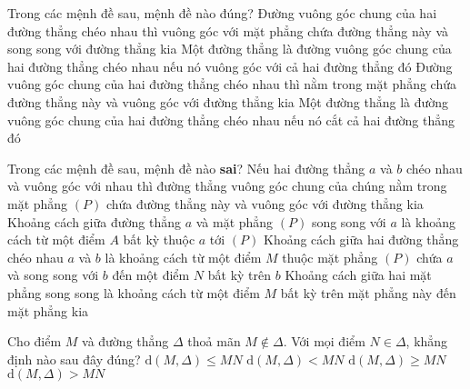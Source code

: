 \begin{ex}%
	Trong các mệnh đề sau, mệnh đề nào đúng?
	\choice
	{\True Đường vuông góc chung của hai đường thẳng chéo nhau thì vuông góc với mặt phẳng chứa đường thẳng này và song song với đường thẳng kia}
	{Một đường thẳng là đường vuông góc chung của hai đường thẳng chéo nhau nếu nó vuông góc với cả hai đường thẳng đó}
	{Đường vuông góc chung của hai đường thẳng chéo nhau thì nằm trong mặt phẳng chứa đường thẳng này và vuông góc với đường thẳng kia}
	{Một đường thẳng là đường vuông góc chung của hai đường thẳng chéo nhau nếu nó cắt cả hai đường thẳng đó}
\end{ex}
\begin{ex}%
	Trong các mệnh đề sau, mệnh đề nào \textbf{sai}?
	\choice
	{Nếu hai đường thẳng $a$ và $b$ chéo nhau và vuông góc với nhau thì đường thẳng vuông góc chung của chúng nằm trong mặt phẳng $(P)$ chứa đường thẳng này và vuông góc với đường thẳng kia}
	{Khoảng cách giữa đường thẳng $a$ và mặt phẳng $(P)$ song song với $a$ là khoảng cách từ một điểm $A $ bất kỳ thuộc $a$ tới $(P)$}
	{\True Khoảng cách giữa hai đường thẳng chéo nhau $a$ và $b$ là khoảng cách từ một điểm $M$ thuộc mặt phẳng $(P)$ chứa $a$ và song song với $b$ đến một điểm $N$ bất kỳ trên $b$}
	{Khoảng cách giữa hai mặt phẳng song song là khoảng cách từ một điểm $M$ bất kỳ trên mặt phẳng này đến mặt phẳng kia}
\end{ex}
\begin{ex}%
	Cho điểm $M$ và đường thẳng $\Delta$ thoả mãn $M\not \in \Delta$. Với mọi điểm $N \in\Delta$, khẳng định nào sau đây đúng?
	\choice
	{\True $\mathrm{d}(M,\Delta) \le MN$}
	{$\mathrm{d}(M,\Delta) < MN$}
	{$\mathrm{d}(M,\Delta) \ge MN$}
	{$\mathrm{d}(M,\Delta) > MN$}
\end{ex}
